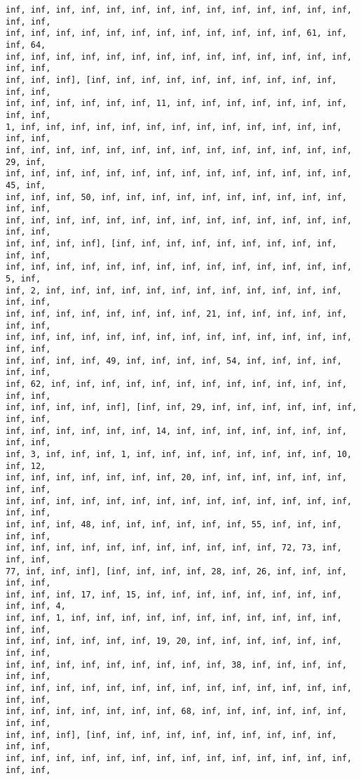 \documentclass[11pt]{article}
\begin{document}
\begin{Verbatim}[commandchars=\\\{\}]
inf, inf, inf, inf, inf, inf, inf, inf, inf, inf, inf, inf, inf, inf, inf, inf,
inf, inf, inf, inf, inf, inf, inf, inf, inf, inf, inf, inf, 61, inf, inf, 64,
inf, inf, inf, inf, inf, inf, inf, inf, inf, inf, inf, inf, inf, inf, inf, inf,
inf, inf, inf], [inf, inf, inf, inf, inf, inf, inf, inf, inf, inf, inf, inf,
inf, inf, inf, inf, inf, inf, 11, inf, inf, inf, inf, inf, inf, inf, inf, inf,
1, inf, inf, inf, inf, inf, inf, inf, inf, inf, inf, inf, inf, inf, inf, inf,
inf, inf, inf, inf, inf, inf, inf, inf, inf, inf, inf, inf, inf, inf, 29, inf,
inf, inf, inf, inf, inf, inf, inf, inf, inf, inf, inf, inf, inf, inf, 45, inf,
inf, inf, inf, 50, inf, inf, inf, inf, inf, inf, inf, inf, inf, inf, inf, inf,
inf, inf, inf, inf, inf, inf, inf, inf, inf, inf, inf, inf, inf, inf, inf, inf,
inf, inf, inf, inf], [inf, inf, inf, inf, inf, inf, inf, inf, inf, inf, inf,
inf, inf, inf, inf, inf, inf, inf, inf, inf, inf, inf, inf, inf, inf, 5, inf,
inf, 2, inf, inf, inf, inf, inf, inf, inf, inf, inf, inf, inf, inf, inf, inf,
inf, inf, inf, inf, inf, inf, inf, inf, 21, inf, inf, inf, inf, inf, inf, inf,
inf, inf, inf, inf, inf, inf, inf, inf, inf, inf, inf, inf, inf, inf, inf, inf,
inf, inf, inf, inf, 49, inf, inf, inf, inf, 54, inf, inf, inf, inf, inf, inf,
inf, 62, inf, inf, inf, inf, inf, inf, inf, inf, inf, inf, inf, inf, inf, inf,
inf, inf, inf, inf, inf], [inf, inf, 29, inf, inf, inf, inf, inf, inf, inf, inf,
inf, inf, inf, inf, inf, inf, 14, inf, inf, inf, inf, inf, inf, inf, inf, inf,
inf, 3, inf, inf, inf, 1, inf, inf, inf, inf, inf, inf, inf, inf, 10, inf, 12,
inf, inf, inf, inf, inf, inf, inf, 20, inf, inf, inf, inf, inf, inf, inf, inf,
inf, inf, inf, inf, inf, inf, inf, inf, inf, inf, inf, inf, inf, inf, inf, inf,
inf, inf, inf, 48, inf, inf, inf, inf, inf, inf, 55, inf, inf, inf, inf, inf,
inf, inf, inf, inf, inf, inf, inf, inf, inf, inf, inf, 72, 73, inf, inf, inf,
77, inf, inf, inf], [inf, inf, inf, inf, 28, inf, 26, inf, inf, inf, inf, inf,
inf, inf, inf, 17, inf, 15, inf, inf, inf, inf, inf, inf, inf, inf, inf, inf, 4,
inf, inf, 1, inf, inf, inf, inf, inf, inf, inf, inf, inf, inf, inf, inf, inf,
inf, inf, inf, inf, inf, inf, 19, 20, inf, inf, inf, inf, inf, inf, inf, inf,
inf, inf, inf, inf, inf, inf, inf, inf, inf, 38, inf, inf, inf, inf, inf, inf,
inf, inf, inf, inf, inf, inf, inf, inf, inf, inf, inf, inf, inf, inf, inf, inf,
inf, inf, inf, inf, inf, inf, inf, 68, inf, inf, inf, inf, inf, inf, inf, inf,
inf, inf, inf], [inf, inf, inf, inf, inf, inf, inf, inf, inf, inf, inf, inf,
inf, inf, inf, inf, inf, inf, inf, inf, inf, inf, inf, inf, inf, inf, inf, inf,

\end{Verbatim}
\end{document}
